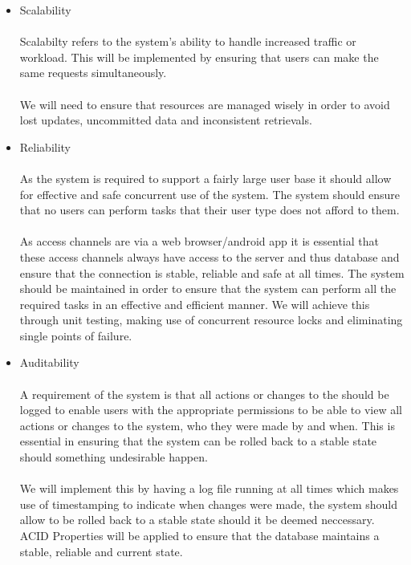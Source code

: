 \documentclass[a4paper]{article}
\begin{document}
\begin{itemize}
\begin{itemize}
    \item Scalability \\\\
        Scalabilty refers to the system's ability to handle increased traffic or workload. This will be implemented by ensuring that users can make the same requests simultaneously.
        \\\\
        We will need to ensure that resources are managed wisely in order to avoid lost updates, uncommitted data and inconsistent retrievals.

    \item Reliability \\\\
        As the system is required to support a fairly large user base it should allow for effective and safe concurrent use of the system. The system should ensure that no users can perform tasks that their user type does not afford to them.
        \\\\
        As access channels are via a web browser/android app it is essential that these access channels always have access to the server and thus database and ensure that the connection is stable, reliable and safe at all times. The system should be maintained in order to ensure that the system can perform all the required tasks in an effective and efficient manner. We will achieve this through unit testing, making use of concurrent resource locks and eliminating single points of failure.
    \item Auditability\\\\
        A requirement of the system is that all actions or changes to the should be logged to enable users with the appropriate permissions to be able to view all actions or changes to the system, who they were made by and when. This is essential in ensuring that the system can be rolled back to a stable state should something undesirable happen.
        \\\\
        We will implement this by having a log file running at all times which makes use of timestamping to indicate when changes were made, the system should allow to be rolled back to a stable state should it be deemed neccessary. ACID Properties will be applied to ensure that the database maintains a stable, reliable and current state.
        

\end{itemize}
\end{itemize}
\end{document}

